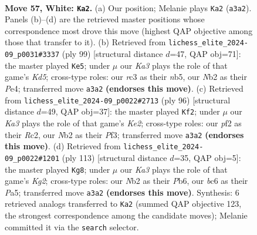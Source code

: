\documentclass[11pt]{article}
\begin{document}
\clearpage

\begin{figure}[p]\centering
\begin{subfigure}{0.46\textwidth}\centering
\resizebox{\linewidth}{!}{%
\newchessgame
\chessboard[
  setfen={8/6k1/1pb5/p1p5/8/K1r3PN/1N2rp1P/5R2 w - - 0 57},
  showmover=false,
  pgfstyle=straightmove, color=movearrow, markmove={a3-a2}
]}
\caption{}
\end{subfigure}\hfill
\begin{subfigure}{0.46\textwidth}\centering
\resizebox{\linewidth}{!}{%
\newchessgame
\chessboard[
  setfen={8/8/5r2/1N6/3kp3/PP1n2P1/3R1PK1/8 b - - 2 50},
  showmover=false,
  pgfstyle=straightmove, color=movearrow, markmove={d4-e5}
]}
\caption{}
\end{subfigure}
\\[4pt]
\begin{subfigure}{0.46\textwidth}\centering
\resizebox{\linewidth}{!}{%
\newchessgame
\chessboard[
  setfen={8/2r5/5p2/3k2p1/R2p3p/2p1rP2/2R1K1P1/8 w - - 4 49},
  showmover=false,
  pgfstyle=straightmove, color=movearrow, markmove={e2-f2}
]}
\caption{}
\end{subfigure}\hfill
\begin{subfigure}{0.46\textwidth}\centering
\resizebox{\linewidth}{!}{%
\newchessgame
\chessboard[
  setfen={8/6k1/1p6/p4RPP/P4n2/1P3r2/5P2/5K2 b - - 0 57},
  showmover=false,
  pgfstyle=straightmove, color=movearrow, markmove={g7-g8}
]}
\caption{}
\end{subfigure}
\caption{\textbf{Move 57, White: \texttt{Ka2}.} (a) Our position; Melanie plays \texttt{Ka2} (\texttt{a3a2}). Panels (b)--(d) are the retrieved master positions whose correspondence most drove this move (highest QAP objective among those that transfer to it). (b) Retrieved from \texttt{lichess\_elite\_2024-09\_p0031\#3337} (ply 99) [structural distance $d$=47, QAP obj=71]: the master played \texttt{Ke5}; under $\mu$ our \emph{Ka3} plays the role of that game's \emph{Kd5}; cross-type roles: our \emph{r}c3 as their \emph{n}b5, our \emph{N}b2 as their \emph{P}e4; transferred move \texttt{a3a2} \textbf{(endorses this move)}. (c) Retrieved from \texttt{lichess\_elite\_2024-09\_p0022\#2713} (ply 96) [structural distance $d$=49, QAP obj=37]: the master played \texttt{Kf2}; under $\mu$ our \emph{Ka3} plays the role of that game's \emph{Ke2}; cross-type roles: our \emph{p}f2 as their \emph{R}c2, our \emph{N}b2 as their \emph{P}f3; transferred move \texttt{a3a2} \textbf{(endorses this move)}. (d) Retrieved from \texttt{lichess\_elite\_2024-09\_p0022\#1201} (ply 113) [structural distance $d$=35, QAP obj=5]: the master played \texttt{Kg8}; under $\mu$ our \emph{Ka3} plays the role of that game's \emph{Kg2}; cross-type roles: our \emph{N}b2 as their \emph{P}b6, our \emph{b}c6 as their \emph{P}a5; transferred move \texttt{a3a2} \textbf{(endorses this move)}. Synthesis: 6 retrieved analogs transferred to \texttt{Ka2} (summed QAP objective 123, the strongest correspondence among the candidate moves); Melanie committed it via the \texttt{search} selector.}
\label{fig:thought-m112}
\end{figure}
\end{document}
